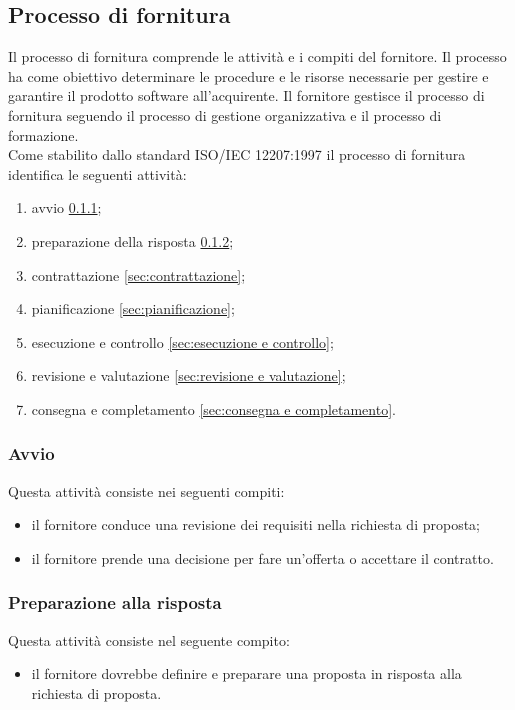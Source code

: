 \subsection{Processo di fornitura}\label{sec:organizationalP}
Il processo di fornitura comprende le attività e i compiti del fornitore. Il processo ha come obiettivo determinare le procedure e le risorse necessarie per gestire e garantire il prodotto software all'acquirente.
Il fornitore gestisce il processo di fornitura seguendo il processo di gestione organizzativa e il processo di formazione. \\
    Come stabilito dallo standard ISO/IEC 12207:1997 \cite{bib:ISO12207_1997} il processo di fornitura identifica le seguenti attività:
    \begin{enumerate}
        \item avvio \ref{sec:avvio};
        \item preparazione della risposta \ref{sec:preparazione};
        \item contrattazione \ref{sec:contrattazione};
        \item pianificazione \ref{sec:pianificazione};
        \item esecuzione e controllo \ref{sec:esecuzione e controllo};
        \item revisione e valutazione \ref{sec:revisione e valutazione};
        \item consegna e completamento \ref{sec:consegna e completamento}.
    \end{enumerate}

    \subsubsection{Avvio}\label{sec:avvio}
        Questa attività consiste nei seguenti compiti:
        \begin{itemize}
            \item il fornitore conduce una revisione dei requisiti nella richiesta di proposta;
            \item il fornitore prende una decisione per fare un'offerta o accettare il contratto.
        \end{itemize}

    \subsubsection{Preparazione alla risposta}\label{sec:preparazione}
        Questa attività consiste nel seguente compito:
        \begin{itemize}
            \item il fornitore dovrebbe definire e preparare una proposta in risposta alla richiesta di proposta.
        \end{itemize}

